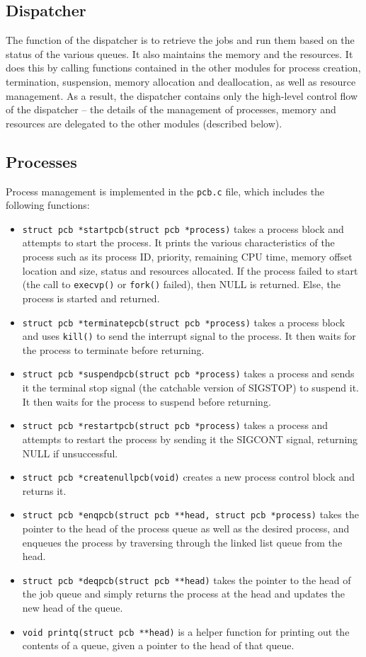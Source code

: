 \documentclass[12pt]{article}
\begin{document}
\subsection{Dispatcher}
The function of the dispatcher is to retrieve the jobs and run them based on
the status of the various queues. It also maintains the memory and the
resources. It does this by calling functions contained in the other modules
for process creation, termination, suspension, memory allocation and
deallocation, as well as resource management. As a result, the dispatcher
contains only the high-level control flow of the dispatcher -- the details of
the management of processes, memory and resources are delegated to the other
modules (described below).

\subsection{Processes}
Process management is implemented in the \texttt{pcb.c} file, which includes 
the following functions:
\begin{itemize}
\item \texttt{struct pcb *startpcb(struct pcb *process)} takes a process block 
and attempts to start the process. It prints the various characteristics of the
process such as its process ID, priority, remaining CPU time, memory offset
location and size, status and resources allocated. If the process failed to
start (the call to \texttt{execvp()} or \texttt{fork()} failed), then NULL is 
returned. Else, the process is started and returned.
\item \texttt{struct pcb *terminatepcb(struct pcb *process)} takes a process
block and uses \texttt{kill()} to send the interrupt signal to the process. It
then waits for the process to terminate before returning.
\item \texttt{struct pcb *suspendpcb(struct pcb *process)} takes a process and
sends it the terminal stop signal (the catchable version of SIGSTOP) to suspend
it. It then waits for the process to suspend before returning.
\item \texttt{struct pcb *restartpcb(struct pcb *process)} takes a process and
attempts to restart the process by sending it the SIGCONT signal, returning
NULL if unsuccessful.
\item \texttt{struct pcb *createnullpcb(void)} creates a new process control 
block and returns it.
\item \texttt{struct pcb *enqpcb(struct pcb **head, struct pcb *process)} takes
the pointer to the head of the process queue as well as the desired process, 
and enqueues the process by traversing through the linked list queue from 
the head.
\item \texttt{struct pcb *deqpcb(struct pcb **head)} takes the pointer to the 
head of the job queue and simply returns the process at the head and updates
the new head of the queue.
\item \texttt{void printq(struct pcb **head)} is a helper function for printing
out the contents of a queue, given a pointer to the head of that queue.
\end{itemize}
\end{document}
